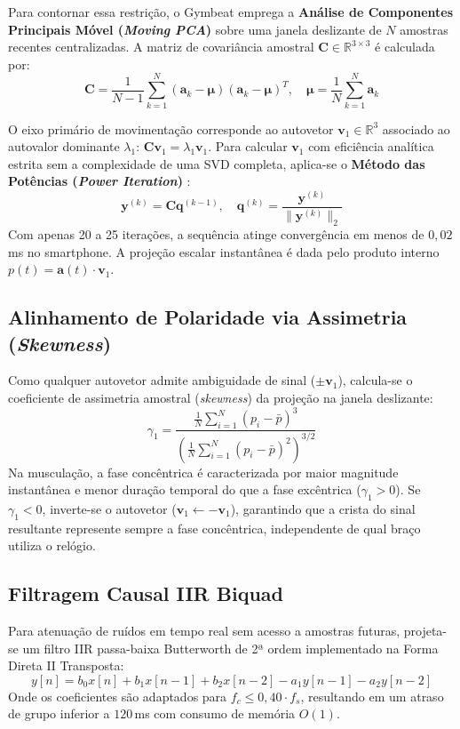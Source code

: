 \documentclass[12pt]{article}
\begin{document}
Para contornar essa restrição, o Gymbeat emprega a \textbf{Análise de Componentes Principais Móvel (\textit{Moving PCA})} sobre uma janela deslizante de $N$ amostras recentes centralizadas. A matriz de covariância amostral $\mathbf{C} \in \mathbb{R}^{3 \times 3}$ é calculada por:
\begin{equation}
\mathbf{C} = \frac{1}{N-1} \sum_{k=1}^N (\mathbf{a}_k - \boldsymbol{\mu})(\mathbf{a}_k - \boldsymbol{\mu})^T, \quad \boldsymbol{\mu} = \frac{1}{N} \sum_{k=1}^N \mathbf{a}_k
\end{equation}

O eixo primário de movimentação corresponde ao autovetor $\mathbf{v}_1 \in \mathbb{R}^3$ associado ao autovalor dominante $\lambda_1$: $\mathbf{C}\mathbf{v}_1 = \lambda_1 \mathbf{v}_1$. Para calcular $\mathbf{v}_1$ com eficiência analítica estrita sem a complexidade de uma SVD completa, aplica-se o \textbf{Método das Potências (\textit{Power Iteration})} \cite{golub2013}:
\begin{equation}
\mathbf{y}^{(k)} = \mathbf{C} \mathbf{q}^{(k-1)}, \quad \mathbf{q}^{(k)} = \frac{\mathbf{y}^{(k)}}{\|\mathbf{y}^{(k)}\|_2}
\end{equation}
Com apenas 20 a 25 iterações, a sequência atinge convergência em menos de $0{,}02\,$ms no smartphone. A projeção escalar instantânea é dada pelo produto interno $p(t) = \mathbf{a}(t) \cdot \mathbf{v}_1$.

\subsection{Alinhamento de Polaridade via Assimetria (\textit{Skewness})}
Como qualquer autovetor admite ambiguidade de sinal ($\pm \mathbf{v}_1$), calcula-se o coeficiente de assimetria amostral (\textit{skewness}) da projeção na janela deslizante:
\begin{equation}
\gamma_1 = \frac{\frac{1}{N} \sum_{i=1}^N (p_i - \bar{p})^3}{\left( \frac{1}{N} \sum_{i=1}^N (p_i - \bar{p})^2 \right)^{3/2}}
\end{equation}
Na musculação, a fase concêntrica é caracterizada por maior magnitude instantânea e menor duração temporal do que a fase excêntrica ($\gamma_1 > 0$). Se $\gamma_1 < 0$, inverte-se o autovetor ($\mathbf{v}_1 \leftarrow -\mathbf{v}_1$), garantindo que a crista do sinal resultante represente sempre a fase concêntrica, independente de qual braço utiliza o relógio.

\subsection{Filtragem Causal IIR Biquad}
Para atenuação de ruídos em tempo real sem acesso a amostras futuras, projeta-se um filtro IIR passa-baixa Butterworth de 2ª ordem implementado na Forma Direta II Transposta:
\begin{equation}
y[n] = b_0 x[n] + b_1 x[n-1] + b_2 x[n-2] - a_1 y[n-1] - a_2 y[n-2]
\end{equation}
Onde os coeficientes são adaptados para $f_c \le 0{,}40 \cdot f_s$, resultando em um atraso de grupo inferior a $120\,$ms com consumo de memória $O(1)$.
\end{document}
